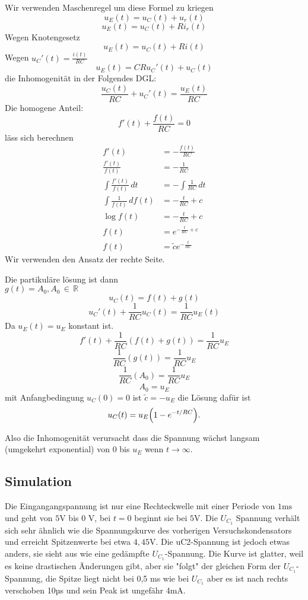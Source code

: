 Wir verwenden Maschenregel um diese Formel zu kriegen
\[u_E(t)=u_C(t)+u_r(t)\]
\[u_E(t)=u_C(t)+R i_r(t)\]
Wegen Knotengesetz
\[u_E(t)=u_C(t)+R i(t)\]
Wegen $u_C'(t)=\frac{i(t)}{RC}$
\[u_E(t)=C R u_C'(t)+u_C(t)\]
die Inhomogenität in der Folgendes DGL:
\[\frac{u_C(t)}{R C}+u_C'(t)=\frac{u_E(t)}{RC}\]
Die homogene Anteil:
\[f'(t)+\frac{f(t)}{RC}=0\] läss sich berechnen
\begin{align*}
    f'(t)&=-\frac{f(t)}{RC}\\
   \frac{f'(t)}{f(t)}&=-\frac{1}{RC}\\
   \int \frac{f'(t)}{f(t)} \,   dt&=-\int \frac{1}{RC} \,   dt\\ 
   \int \frac{1}{f(t)} \,   df(t)&=-\frac{t}{RC}+c\\
   \log f(t)&=-\frac{t}{RC}+c\\
   f(t)&=e^{-\frac{t}{RC}+c}\\
   f(t)&=\tilde{c}e^{-\frac{t}{RC}}
   \end{align*}
Wir verwenden den Ansatz der rechte Seite. \cite{src:lindgl}

Die partikuläre lösung ist dann\\
$g(t)=A_0,A_0\,\in\,\mathbb R$
\[u_C(t)=f(t)+g(t)\]
\[u_C'(t)+\frac{1}{R C}u_C(t)=\frac{1}{RC}u_E(t)\]
Da $u_E(t)=u_E$ konstant ist.
\[f'(t)+\frac{1}{R C}(f(t)+g(t))=\frac{1}{RC}u_E \]
\[\frac{1}{R C}(g(t))=\frac{1}{RC}u_E\]
\[\frac{1}{R C}(A_0)=\frac{1}{RC}u_E\]
\[A_0=u_E\]
mit Anfangbedingung $u_C(0)=0$ ist $\tilde{c}=-u_E$
die Lösung dafür ist \[u_C(t)=u_E\qty(1-e^{-t/RC}).\]


Also die Inhomogenität verursacht dass die Spannung wächst langsam (umgekehrt exponential) von $0$ bis $u_E$ wenn $t\rightarrow\infty$.\\
\subsection{Simulation} Die Eingangangspannung ist nur eine Rechteckwelle mit einer Periode von $1\si{\milli\second}$ und geht von $5\si{\volt}$ bis 0 V, bei $t = 0$ beginnt sie bei $5\si{\volt}$. Die $U_{C_1}$ Spannung verhält sich sehr ähnlich wie die Spannungskurve des vorherigen Versuchskondensators und erreicht Spitzenwerte bei etwa $4,45\si{\volt}$. Die uC2-Spannung ist jedoch etwas anders, sie sieht aus wie eine gedämpfte $U_{C_1}$-Spannung. Die Kurve ist glatter, weil es keine drastischen Änderungen gibt, aber sie "folgt" der gleichen Form der $U_{C_1}$-Spannung, die Spitze liegt nicht bei 0,5 ms wie bei $U_{C_1}$ aber es ist nach rechts verschoben 10µs und sein Peak ist ungefähr 4$\si{\milli\ampere}$.



